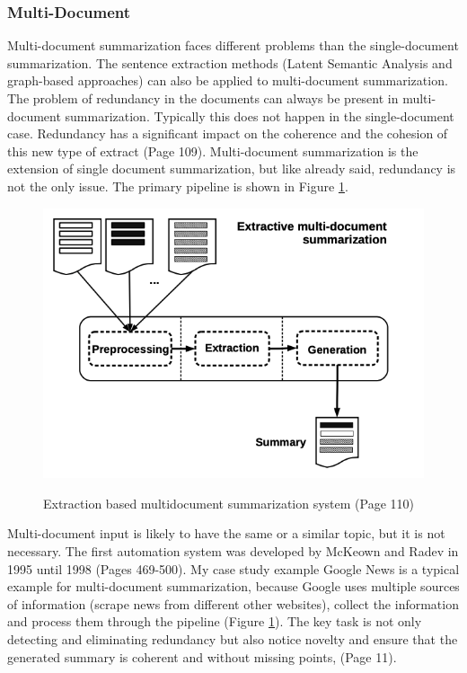 \subsubsection{Multi-Document}\label{ss:multi}

Multi-document summarization faces different problems than the single-document summarization. The sentence extraction methods (Latent Semantic Analysis and graph-based approaches) can also be applied to multi-document summarization. The problem of redundancy in the documents can always be present in multi-document summarization. Typically this does not happen in the single-document case. Redundancy has a significant impact on the coherence and the cohesion of this new type of extract \cite{juan} (Page 109). Multi-document summarization is the extension of single document summarization, but like already said, redundancy is not the only issue. The primary pipeline is shown in Figure \ref{multi}. 

\begin{figure}
	\begin{center}
		\includegraphics[width=4.5in]{photos/multidoc}\\
		\caption{Extraction based multidocument summarization system \cite{juan} (Page 110)}\label{multi}
	\end{center}
\end{figure}

Multi-document input is likely to have the same or a similar topic, but it is not necessary. The first automation system was developed by McKeown and Radev in 1995 until 1998 \cite{radev-mckeown-1998-generating} (Pages 469-500). My case study example Google News is a typical example for multi-document summarization, because Google uses multiple sources of information (scrape news from different other websites), collect the information and process them through the pipeline (Figure \ref{multi}). The key task is not only detecting and eliminating redundancy but also notice novelty and ensure that the generated summary is coherent and without missing points, \cite{Das07asurvey} (Page 11).
 
